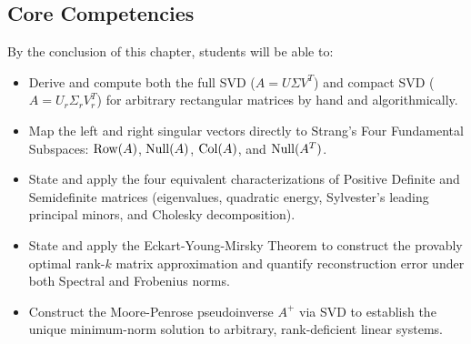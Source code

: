\subsection{Core Competencies}
By the conclusion of this chapter, students will be able to:
\begin{itemize}
    \item Derive and compute both the full SVD ($A = U \Sigma V^T$) and compact SVD ($A = U_r \Sigma_r V_r^T$) for arbitrary rectangular matrices by hand and algorithmically.
    \item Map the left and right singular vectors directly to Strang's Four Fundamental Subspaces: $\operatorname{Row}(A)$, $\operatorname{Null}(A)$, $\operatorname{Col}(A)$, and $\operatorname{Null}(A^T)$.
    \item State and apply the four equivalent characterizations of Positive Definite and Semidefinite matrices (eigenvalues, quadratic energy, Sylvester's leading principal minors, and Cholesky decomposition).
    \item State and apply the Eckart-Young-Mirsky Theorem to construct the provably optimal rank-$k$ matrix approximation and quantify reconstruction error under both Spectral and Frobenius norms.
    \item Construct the Moore-Penrose pseudoinverse $A^+$ via SVD to establish the unique minimum-norm solution to arbitrary, rank-deficient linear systems.
\end{itemize}

